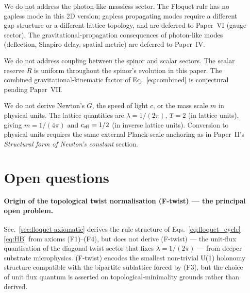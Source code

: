 \documentclass[11pt,a4paper]{article}
\begin{document}
We do not address the photon-like massless sector. The
Floquet rule has no gapless mode in this 2D version; gapless
propagating modes require a different gap structure or a
different lattice topology, and are deferred to Paper~VI
(gauge sector). The gravitational-propagation consequences of
photon-like modes (deflection, Shapiro delay, spatial metric)
are deferred to Paper~IV.

We do not address coupling between the spinor and scalar
sectors. The scalar reserve $R$ is uniform throughout the
spinor's evolution in this paper. The combined
gravitational-kinematic factor of Eq.~\eqref{eq:combined} is
conjectural pending Paper~VII.

We do not derive Newton's $G$, the speed of light $c$, or the
mass scale $m$ in physical units. The lattice quantities are
$\lambda = 1/(2\pi)$, $T = 2$ (in lattice units), giving
$m = 1/(4\pi)$ and $c_{\rm eff} = 1/2$ (in inverse lattice
units). Conversion to physical units requires the same
external Planck-scale anchoring as in Paper~II's
\emph{Structural form of Newton's constant} section.

\section{Open questions}
\label{sec:open}

\paragraph{Origin of the topological twist normalisation
(F-twist) --- the principal open problem.}
Sec.~\ref{sec:floquet-axiomatic} derives the rule structure of
Eqs.~\eqref{eq:floquet_cycle}--\eqref{eq:HB} from axioms
(F1)--(F4), but does not derive (F-twist) --- the unit-flux
quantisation of the diagonal twist sector that fixes
$\lambda = 1/(2\pi)$ --- from deeper substrate microphysics.
(F-twist) encodes the smallest non-trivial U(1) holonomy
structure compatible with the bipartite sublattice forced by
(F3), but the choice of unit flux quantum is asserted on
topological-minimality grounds rather than derived.
\end{document}
